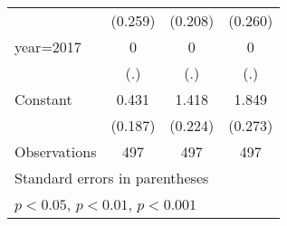 {\begin{tabular}{l*{3}{c}}
                    &     (0.259)         &     (0.208)         &     (0.260)         \\
[1em]
year=2017           &           0         &           0         &           0         \\
                    &         (.)         &         (.)         &         (.)         \\
[1em]
Constant            &       0.431\sym{*}  &       1.418\sym{***}&       1.849\sym{***}\\
                    &     (0.187)         &     (0.224)         &     (0.273)         \\
\hline
Observations        &         497         &         497         &         497         \\
\hline\hline
\multicolumn{4}{l}{\footnotesize Standard errors in parentheses}\\
\multicolumn{4}{l}{\footnotesize \sym{*} \(p<0.05\), \sym{**} \(p<0.01\), \sym{***} \(p<0.001\)}\\
\end{tabular}
}
